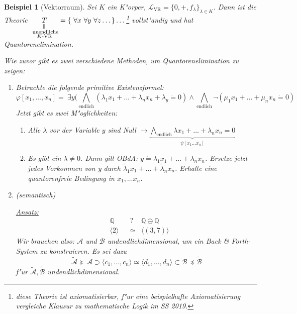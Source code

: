\documentclass[a4paper,12pt,numbers=noenddot,parskip=full]{scrartcl}
\newcommand{\setQ}{\mathbb{Q}}
\newcommand{\Forall}{~\forall}
\newcommand{\Exists}{~\exists}
\newcommand{\scrL}{\mathcal{L}}
\newcommand{\scrA}{\mathcal{A}}
\newcommand{\scrB}{\mathcal{B}}
\theoremstyle{dotless}
\newtheorem{example}[theorem]{Beispiel}
\theoremstyle{remark}
\begin{document}
\begin{example}[Vektorraum]
	Sei $K$ ein K"orper, $\scrL_\text{VR} = \{0, +, f_\lambda \}_{\lambda \in K}$. Dann ist die Theorie $\underset{\substack{\rotatebox{90}{$=$} \\ \text{ unendliche}\\ K\text{-VR}}}{T} = \{\Forall x \Forall y \Forall z \dots \} \dots$\footnote{diese Theorie ist axiomatisierbar, f"ur eine beispielhafte Axiomatisierung vergleiche Klausur zu mathematische Logik im SS 2019.} vollst"andig und hat Quantorenelimination.
	
	Wie zuvor gibt es zwei verschiedene Methoden, um Quantorenelimination zu zeigen:
	\begin{enumerate}
		\item Betrachte die folgende primitive Existenzformel: 
		\begin{equation*}
			\varphi[x_1, \dots, x_n] = \Exists y (\bigwedge\limits_{\text{endlich}} (\lambda_1 x_1 + \dots + \lambda_n x_n + \lambda_y \dot= 0) \land \bigwedge\limits_{\text{endlich}} \lnot (\mu_1 x_1 + \dots + \mu_n x_n \dot= 0)
		\end{equation*}
		Jetzt gibt es zwei M"oglichkeiten:
		\begin{enumerate}
			\item \emph{Alle $\lambda$ vor der Variable $y$ sind Null} $\rightarrow \underbrace{\bigwedge\limits_{\text{endlich}} \lambda x_1 + \dots + \lambda_n x_n = 0}_{\psi[x_1 \dots x_n]}$
			
			\item \emph{Es gibt ein $\lambda \neq 0$}. Dann gilt OBdA: $y \dot= \lambda_1 x_1 + \dots + \lambda_n x_n$. Ersetze jetzt jedes Vorkommen von y durch $\tilde{\lambda}_1 x_1 + \dots + \tilde{\lambda}_n x_n$. Erhalte eine quantorenfreie Bedingung in $x_1, \dots x_n$.
		\end{enumerate}
		
		\item (semantisch)
		
		\underline{Ansatz:} \begin{align*}
			&\setQ &&? &\setQ \oplus \setQ \\
			&\langle 2 \rangle &&\simeq &\langle (3,7) \rangle
		\end{align*}
		Wir brauchen also: $\scrA$ und $\scrB$ undendlichdimensional, um ein Back \& Forth-System zu konstruieren. Es sei dazu
		\begin{equation*}
			\tilde{\scrA} \succeq \scrA \supset \langle c_1, \dots, c_n \rangle \simeq \langle d_1, \dots , d_n \rangle \subset \scrB \preceq \tilde{\scrB}
		\end{equation*}
		f"ur $\tilde{\scrA}, \tilde{\scrB}$ undendlichdimensional.
		

\end{enumerate}
\end{example}
\end{document}
